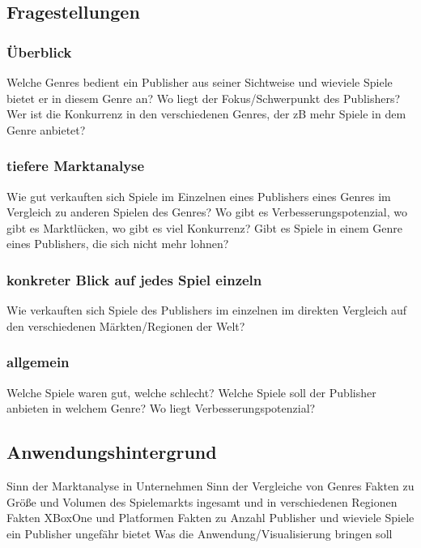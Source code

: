 \documentclass[usegeometry=true]{scrartcl}
\begin{document}
\subsection{Fragestellungen} 
\subsubsection{Überblick} 
Welche Genres bedient ein Publisher aus seiner Sichtweise und wieviele Spiele bietet er in diesem Genre an? 
Wo liegt der Fokus/Schwerpunkt des Publishers? Wer ist die Konkurrenz in den verschiedenen Genres, der zB mehr Spiele in dem Genre anbietet?
\subsubsection{tiefere Marktanalyse} 
Wie gut verkauften sich Spiele im Einzelnen eines Publishers eines Genres im Vergleich zu anderen Spielen des Genres? 
Wo gibt es Verbesserungspotenzial, wo gibt es Marktlücken, wo gibt es viel Konkurrenz? Gibt es Spiele in einem Genre eines Publishers, die sich nicht mehr lohnen?
\subsubsection{konkreter Blick auf jedes Spiel einzeln} 
Wie verkauften sich Spiele des Publishers im einzelnen im direkten Vergleich auf den verschiedenen Märkten/Regionen der Welt?
\subsubsection{allgemein} 
Welche Spiele waren gut, welche schlecht? Welche Spiele soll der Publisher anbieten in welchem Genre? Wo liegt Verbesserungspotenzial?


\subsection{Anwendungshintergrund}
Sinn der Marktanalyse in Unternehmen
Sinn der Vergleiche von Genres
Fakten zu Größe und Volumen des Spielemarkts ingesamt und in verschiedenen Regionen
Fakten XBoxOne und Platformen 
Fakten zu Anzahl Publisher und wieviele Spiele ein Publisher ungefähr bietet
Was die Anwendung/Visualisierung bringen soll
\end{document}
